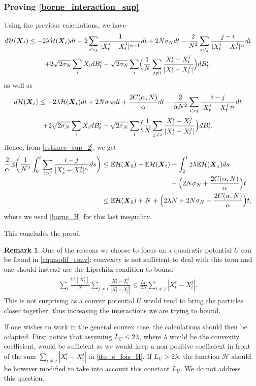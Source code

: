 \documentclass[JEP,XML,SOM,Unicode,published]{cedram}
\newcommand{\bX}{{\boldsymbol{X}}}
\theoremstyle{plain}
\theoremstyle{definition}
\newtheorem{remark}{Remark}[section]
\begin{document}
\subsubsection*{Proving \eqref{borne_interaction_sup}} Using the previous calculations, we have
\begin{multline*}
d\mathcal{H}(\bX_t)\leq -2\lambda \mathcal{H}(\bX_t)dt+2\sum_{i>j}\frac{1}{|X^i_t-X^j_t|^{\alpha-1}}dt+2N\sigma_Ndt-\frac{2}{N^2}\sum_{i<j}\frac{j-i}{|X^i_t-X^j_t|^\alpha}dt\\
+2\sqrt{2\sigma_N}\sum_iX_idB^i_t-\sqrt{2\sigma_N}\sum_i\Bigl(\frac{1}{N}\sum_{j\neq i}\frac{X^i_t-X^j_t}{|X^i_t-X^j_t|}\Bigr)dB^i_t,
\end{multline*}
as well as
\begin{multline}
d\mathcal{H}(\bX_t)\leq -2\lambda \mathcal{H}(\bX_t)dt+2N\sigma_Ndt+\frac{2C(\alpha,N)}{\alpha}dt-\frac{2}{\alpha N^2}\sum_{i>j}\frac{i-j}{|X^i_t-X^j_t|^{\alpha}}dt\\
+2\sqrt{2\sigma_N}\sum_iX_idB^i_t-\sqrt{2\sigma_N}\sum_i\Bigl(\frac{1}{N}\sum_{j\neq i}\frac{X^i_t-X^j_t}{|X^i_t-X^j_t|}\Bigr)dB^i_t\label{estimee_sup_2}.
\end{multline}
Hence, from \eqref{estimee_sup_2}, we get
\begin{align*}
\frac{2}{\alpha}\mathbb{E}\biggl(\frac{1}{N^2}\int_0^t\sum_{i>j}\frac{i-j}{|X^i_s-X^j_s|^{\alpha}}ds\biggr)&\leq \mathbb{E}\mathcal{H}(\bX_0)-\mathbb{E}\mathcal{H}(\bX_t)-\int_0^t2\lambda\mathbb{E}\mathcal{H}(\bX_s)ds\\[-5pt]
&\hspace*{3.5cm}+\Bigl(2N\sigma_N+\frac{2C(\alpha,N)}{\alpha}\Bigr)t\\
&\leq \mathbb{E}\mathcal{H}(\bX_0)+N+\Bigl(2\lambda N+2N\sigma_N+\frac{2C(\alpha,N)}{\alpha}\Bigr)t,
\end{align*}
where we used \eqref{borne_H} for this last inequality.

This concludes the proof.

\begin{remark}\label{rem:modif_conv}
One of the reasons we choose to focus on a quadratic potential $U$ can be found in \eqref{eq:modif_conv}: convexity is not sufficient to deal with this term and one should instead use the Lipschitz condition to bound
\begin{align*}
\sum_i\frac{U'\left(X^i_t\right)}{N}\sum_{j\neq i}\frac{X^i_t-X^j_t}{|X^i_t-X^j_t|}\leq\frac{L_U}{2N}\sum_{i\neq j}|X^i_t-X^j_t|.
\end{align*}
This is not surprising as a convex potential $U$ would tend to bring the particles closer together, thus increasing the interactions we are trying to bound.

If one wishes to work in the general convex case, the calculations should then be adapted. First notice that assuming $L_U\leq 2\lambda$, where $\lambda$ would be the convexity coefficient, would be sufficient as we would keep a non positive coefficient in front of the sum $\sum_{i\neq j}|X^i_t-X^j_t|$ in \eqref{ito_e_fois_H}. If $L_U> 2\lambda$, the function $\mathcal{H}$ should be however modified to take into account this constant $L_U$. We do not address this question.
\end{remark}
\end{document}
